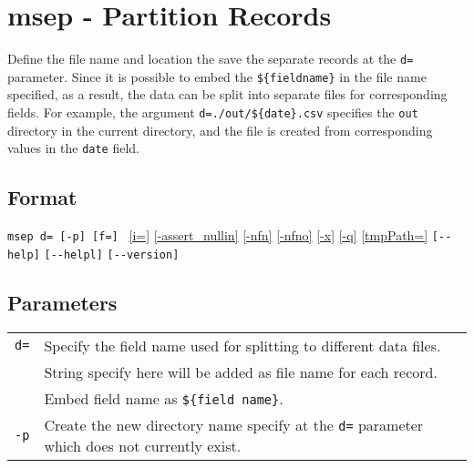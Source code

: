 
%

\section{msep - Partition Records\label{sect:msep}}

Define the file name and location the save the separate records at the \verb|d=| parameter. Since it is possible to embed the \verb|${fieldname}| in the file name specified, as a result, the data can be split into separate files for corresponding fields. For example, the argument \verb|d=./out/${date}.csv| specifies the \verb|out| directory in the current directory, and the file is created from corresponding values in the \verb|date| field.




\subsection*{Format}
\verb|msep d= [-p] [f=] |  
\hyperref[sect:option_i]{[i=]}
\hyperref[sect:option_assert_nullin]{[-assert\_nullin]}
\hyperref[sect:option_nfn]{[-nfn]} 
\hyperref[sect:option_nfno]{[-nfno]}  
\hyperref[sect:option_x]{[-x]}
\hyperref[sect:option_q]{[-q]}
\hyperref[sect:option_option_tmppath]{[tmpPath=]}
\verb|[--help]|
\verb|[--helpl]|
\verb|[--version]|\\

\subsection*{Parameters}
\begin{table}[htbp]
{\small
\begin{tabular}{ll}
\verb|d=|    & Specify the field name used for splitting to different data files.\\
             & String specify here will be added as file name for each record. \\
             & Embed field name as \verb|${field name}|.\\
\verb|-p|    & Create the new directory name specify at the \verb|d=| parameter which does not currently exist.\\
\end{tabular} 
}
\end{table} 


